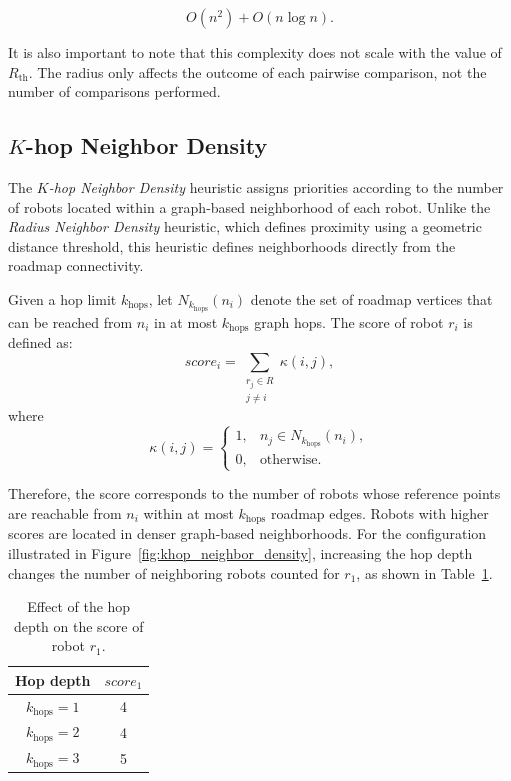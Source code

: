 \begin{equation}
\label{eq:radius_neighbor_density_complexity}
    O(n^2) + O(n \log n).
\end{equation}

It is also important to note that this complexity does not scale with the value of \(R_{\text{th}}\). The radius only affects the outcome of each pairwise comparison, not the number of comparisons performed.

\subsection{\(K\)-hop Neighbor Density}
\label{subsec:K_hop_neighbor_density}
\hspace{\parindent}
The \textit{\(K\)-hop Neighbor Density} heuristic assigns priorities according to the number of robots located within a graph-based neighborhood of each robot. Unlike the \textit{Radius Neighbor Density} heuristic, which defines proximity using a geometric distance threshold, this heuristic defines neighborhoods directly from the roadmap connectivity.

Given a hop limit $k_{\text{hops}}$, let $N_{k_{\text{hops}}}(n_i)$ denote the set of roadmap vertices that can be reached from $n_i$ in at most $k_{\text{hops}}$ graph hops. The score of robot $r_i$ is defined as:
\begin{equation}
    score_i =
    \sum_{\substack{r_j \in R \\ j \neq i}}
    \kappa(i,j),
\end{equation}
where
\begin{equation}
\kappa(i,j)=
\begin{cases}
1, & n_j \in N_{k_{\text{hops}}}(n_i), \\
0, & \text{otherwise}.
\end{cases}
\end{equation}

Therefore, the score corresponds to the number of robots whose reference points are reachable from $n_i$ within at most $k_{\text{hops}}$ roadmap edges. Robots with higher scores are located in denser graph-based neighborhoods.
For the configuration illustrated in Figure~\ref{fig:khop_neighbor_density}, increasing the hop depth changes the number of neighboring robots counted for $r_1$, as shown in Table~\ref{tab:khop_neighbor_density_example}.

\begin{table}[H]
\centering
\caption{Effect of the hop depth on the score of robot $r_1$.}
\label{tab:khop_neighbor_density_example}
\footnotesize
\renewcommand{\arraystretch}{0.9}
\begin{tabular}{c c}
\toprule
\textbf{Hop depth} & \textbf{$score_1$} \\
\midrule
$k_{\text{hops}} = 1$ & 4 \\
$k_{\text{hops}} = 2$ & 4 \\
$k_{\text{hops}} = 3$ & 5 \\
\bottomrule
\end{tabular}
\end{table}

